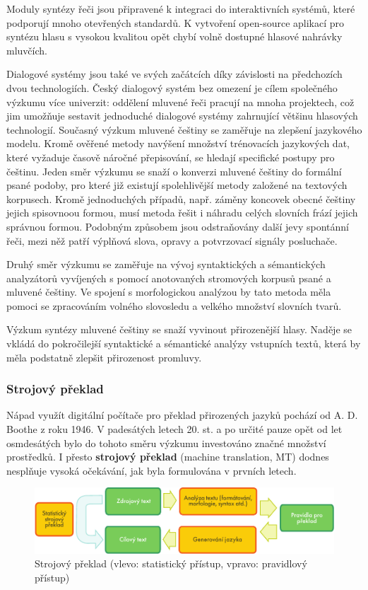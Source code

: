 \begin{multicols}{2}
Moduly syntézy řeči jsou připravené k integraci do interaktivních systémů, které podporují mnoho otevřených standardů. K vytvoření open-source aplikací pro syntézu hlasu s vysokou kvalitou opět chybí volně dostupné hlasové nahrávky mluvčích.

Dialogové systémy jsou také ve svých začátcích díky závislosti na předchozích dvou technologiích. Český dialogový systém bez omezení je cílem společného výzkumu více univerzit: oddělení mluvené řeči pracují na mnoha projektech, což jim umožňuje sestavit jednoduché dialogové systémy zahrnující většinu hlasových technologií. Současný výzkum mluvené češtiny se zaměřuje na zlepšení jazykového modelu.  Kromě ověřené metody navýšení množství trénovacích jazykových dat, které vyžaduje časově náročné přepisování, se hledají specifické postupy pro češtinu. Jeden směr výzkumu se snaží o konverzi mluvené češtiny do formální psané podoby, pro které již existují spolehlivější metody založené na textových korpusech. Kromě jednoduchých případů, např. záměny koncovek obecné češtiny jejich spisovnoou formou, musí metoda řešit i náhradu celých slovních frází jejich správnou formou. Podobným způsobem jsou odstraňovány další jevy spontánní řeči, mezi něž patří výplňová slova, opravy a potvrzovací signály posluchače.

Druhý směr výzkumu se zaměřuje na vývoj syntaktických a sémantických analyzátorů vyvíjených s pomocí anotovaných stromových korpusů psané a mluvené češtiny.  Ve spojení s morfologickou analýzou by tato metoda měla pomoci se zpracováním volného slovosledu a velkého množství slovních tvarů.

Výzkum syntézy mluvené češtiny se snaží vyvinout přirozenější hlasy. Naděje se vkládá do pokročilejší syntaktické a sémantické analýzy vstupních textů, která by měla podstatně zlepšit přirozenost promluvy.

\subsubsection{Strojový překlad}

Nápad využít digitální počítače pro překlad přirozených jazyků pochází od A. D. Boothe z roku 1946. V padesátých letech 20. st. a po určité pauze opět od let osmdesátých bylo do tohoto směru výzkumu investováno značné množství prostředků. I přesto \textbf{strojový překlad} (machine translation, MT) dodnes nesplňuje vysoká očekávání, jak byla formulována v prvních letech.

\begin{figure}[htb]
  \center
  \includegraphics[width=\textwidth]{../_media/czech/machine_translation}
  \caption{Strojový překlad (vlevo: statistický přístup, vpravo: pravidlový přístup)}
  \label{fig:mtarch_cz}
\end{figure}


\end{multicols}
